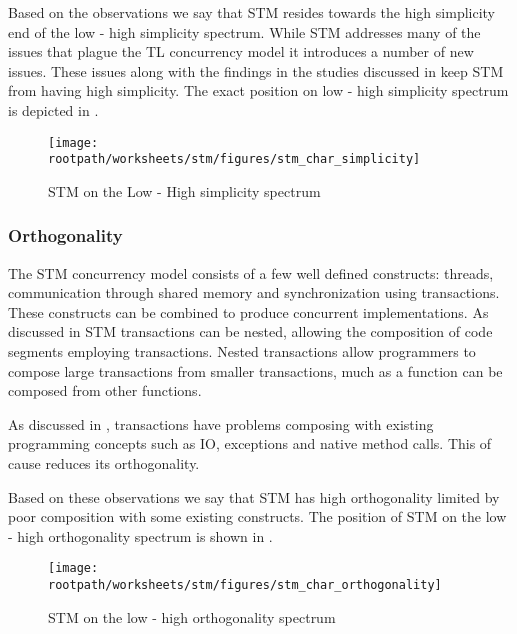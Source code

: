 
Based on the observations we say that \ac{STM} resides towards the high simplicity end of the low - high simplicity spectrum. While \ac{STM} addresses many of the issues that plague the \ac{TL} concurrency model it introduces a number of new issues. These issues along with the findings in the studies discussed in  keep \ac{STM} from having high simplicity. The exact position on low - high simplicity spectrum is depicted in .

\begin{figure}[htbp]
\centering
 \texttt{[image: \\rootpath/worksheets/stm/figures/stm\_char\_simplicity]} 
 \caption{\ac{STM} on the Low - High simplicity spectrum}
\label{fig:stm_char_simplicity}
\end{figure}

\subsubsection{Orthogonality}\label{sec:stm_orthogonality}
\label{subsec:stm_orthogonality}
The \ac{STM} concurrency model consists of a few well defined constructs: threads, communication through shared memory and synchronization using transactions. These constructs can be combined to produce concurrent implementations. As discussed in  \ac{STM} transactions can be nested, allowing the composition of code segments employing transactions. Nested transactions allow programmers to compose large transactions from smaller transactions, much as a function can be composed from other functions.

As discussed in \bsref{}, transactions have problems composing with existing programming concepts such as \ac{IO}, exceptions and native method calls. This of cause reduces its orthogonality.


Based on these observations we say that \ac{STM} has high orthogonality limited by poor composition with some existing constructs. The position of \ac{STM} on the low - high orthogonality spectrum is shown in .

\begin{figure}[htbp]
\centering
 \texttt{[image: \\rootpath/worksheets/stm/figures/stm\_char\_orthogonality]} 
 \caption{\ac{STM} on the low - high orthogonality spectrum}
\label{fig:char_stm_orthogonality}
\end{figure}

